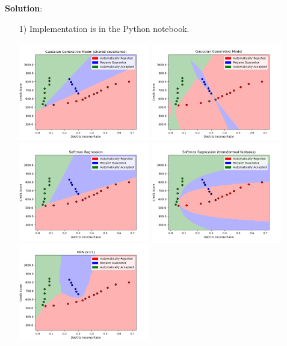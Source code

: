 \documentclass[submit]{../harvardml}
\newenvironment{solution}{
    \vspace{2mm}
    \color{blue}\noindent\textbf{Solution}:
}{}
\begin{document}
\begin{solution}
  \begin{itemize}
  \item[1)] Implementation is in the Python notebook. 
  \begin{center}
    \includegraphics[width=0.45\textwidth]{img_output/Gaussian_Generative_Model_(shared_covariance).png}
    \includegraphics[width=0.45\textwidth]{img_output/Gaussian_Generative_Model.png}
    \includegraphics[width=0.45\textwidth]{img_output/softmax.png}
    \includegraphics[width=0.45\textwidth]{img_output/softmaxtr.png}
    \includegraphics[width=0.45\textwidth]{img_output/KNN1.png}

\end{center}
\end{itemize}
\end{solution}
\end{document}
